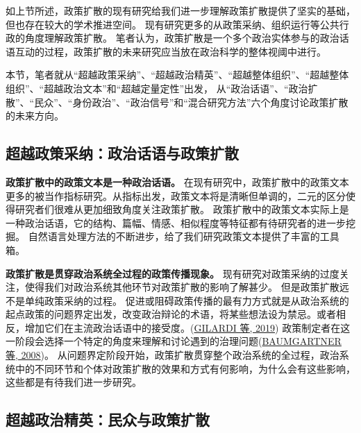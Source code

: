 \documentclass[
  12pt,
]{ctexart}
\begin{document}
如上节所述，政策扩散的现有研究给我们进一步理解政策扩散提供了坚实的基础，但也存在较大的学术推进空间。
现有研究更多的从政策采纳、组织运行等公共行政的角度理解政策扩散。
笔者认为，政策扩散是一个多个政治实体参与的政治话语互动的过程，政策扩散的未来研究应当放在政治科学的整体视阈中进行。

本节，笔者就从``超越政策采纳''、``超越政治精英''、``超越整体组织''、``超越整体组织''、``超越政治文本''和``超越定量定性''出发，
从``政治话语''、``政治扩散''、``民众''、``身份政治''、``政治信号''和``混合研究方法''六个角度讨论政策扩散的未来方向。

\hypertarget{ux8d85ux8d8aux653fux7b56ux91c7ux7eb3ux653fux6cbbux8bddux8bedux4e0eux653fux7b56ux6269ux6563}{%
\subsection{超越政策采纳：政治话语与政策扩散}\label{ux8d85ux8d8aux653fux7b56ux91c7ux7eb3ux653fux6cbbux8bddux8bedux4e0eux653fux7b56ux6269ux6563}}

\textbf{政策扩散中的政策文本是一种政治话语。}
在现有研究中，政策扩散中的政策文本更多的被当作指标研究。从指标出发，政策文本将是清晰但单调的，二元的区分使得研究者们很难从更加细致角度关注政策扩散。
政策扩散中的政策文本实际上是一种政治话语，它的结构、篇幅、情感、相似程度等特征都有待研究者的进一步挖掘。
自然语言处理方法的不断进步，给了我们研究政策文本提供了丰富的工具箱。

\textbf{政策扩散是贯穿政治系统全过程的政策传播现象。}
现有研究对政策采纳的过度关注，使得我们对政治系统其他环节对政策扩散的影响了解甚少。
但是政策扩散远不是单纯政策采纳的过程。
促进或阻碍政策传播的最有力方式就是从政治系统的起点政策的问题界定出发，改变政治辩论的术语，将某些想法设为禁忌。或者相反，增加它们在主流政治话语中的接受度。(\protect\hyperlink{ref-GilardiWasserfallen2019}{GILARDI 等, 2019})
政策制定者在这一阶段会选择一个特定的角度来理解和讨论遇到的治理问题(\protect\hyperlink{ref-BaumgartnerEtAl2008}{BAUMGARTNER 等, 2008})。
从问题界定阶段开始，政策扩散贯穿整个政治系统的全过程，政治系统中的不同环节和个体对政策扩散的效果和方式有何影响，为什么会有这些影响，这些都是有待我们进一步研究。

\hypertarget{ux8d85ux8d8aux653fux6cbbux7cbeux82f1ux6c11ux4f17ux4e0eux653fux7b56ux6269ux6563}{%
\subsection{超越政治精英：民众与政策扩散}\label{ux8d85ux8d8aux653fux6cbbux7cbeux82f1ux6c11ux4f17ux4e0eux653fux7b56ux6269ux6563}}
\end{document}
